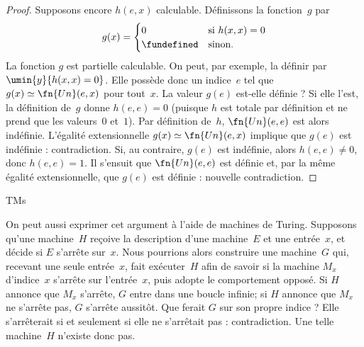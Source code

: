 \documentclass[../../../include/open-logic-section]{subfiles}
\begin{document}
\begin{proof}
Supposons encore $h(e,x)$ calculable.
Définissons la fonction~$g$ par
\[
g(x) =
\begin{cases}
  0           & \text{si $h(x,x)=0$}\\
  \fundefined & \text{sinon.}
\end{cases}
\]
La fonction $g$ est partielle calculable.
On peut, par exemple, la définir par
$\umin{y}{h(x,x)=0}$. Elle possède donc
un indice~$e$ tel que
$g(x) \simeq \fn{Un}(e,x)$ pour tout~$x$.
La valeur $g(e)$ est-elle définie ?
Si elle l'est, la définition de~$g$
donne $h(e,e)=0$ (puisque $h$ est totale
par définition et ne prend que les
valeurs~$0$ et~$1$). Par définition de~$h$,
$\fn{Un}(e,e)$ est alors indéfinie.
L'égalité extensionnelle
$g(x) \simeq \fn{Un}(e,x)$ implique que
$g(e)$ est indéfinie : contradiction.
Si, au contraire, $g(e)$ est indéfinie,
alors $h(e,e)\neq 0$, donc $h(e,e)=1$.
Il s'ensuit que $\fn{Un}(e,e)$ est définie
et, par la même égalité extensionnelle,
que $g(e)$ est définie : nouvelle
contradiction.
\end{proof}

\begin{tagblock}{TMs}
\begin{explain}
On peut aussi exprimer cet argument à l'aide
de machines de Turing. Supposons qu'une machine~$H$
reçoive la description d'une machine~$E$ et
une entrée~$x$, et décide si $E$ s'arrête
sur~$x$. Nous pourrions alors construire
une machine~$G$ qui, recevant une seule
entrée~$x$, fait exécuter~$H$ afin de savoir
si la machine $M_x$ d'indice~$x$ s'arrête
sur l'entrée~$x$, puis adopte le comportement
opposé. Si $H$ annonce que $M_x$ s'arrête,
$G$ entre dans une boucle infinie; si
$H$ annonce que $M_x$ ne s'arrête pas,
$G$ s'arrête aussitôt. Que ferait $G$
sur son propre indice ? Elle s'arrêterait
si et seulement si elle ne s'arrêtait
pas : contradiction. Une telle machine~$H$
n'existe donc pas.
\end{explain}
\end{tagblock}
\end{document}
